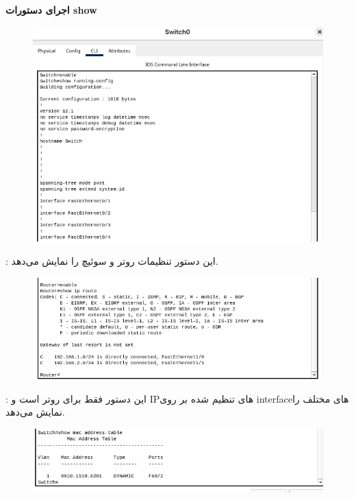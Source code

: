 \clearpage
\textbf{اجرای دستورات show}
\\
\begin{figure}[h]
    \centering
    \includegraphics[width=1\textwidth]{img/q/2.png}
\end{figure}
: این دستور تنظیمات روتر و سوئیچ را نمایش می‌دهد.
\\
\begin{figure}[h]
    \centering
    \includegraphics[width=1\textwidth]{img/q/3.png}
\end{figure}
: این دستور فقط برای روتر است و IPهای تنظیم شده بر روی interfaceهای مختلف را نمایش می‌دهد. 
\\
\begin{figure}[h]
    \centering
    \includegraphics[width=1\textwidth]{img/q/4.png}
\end{figure}
